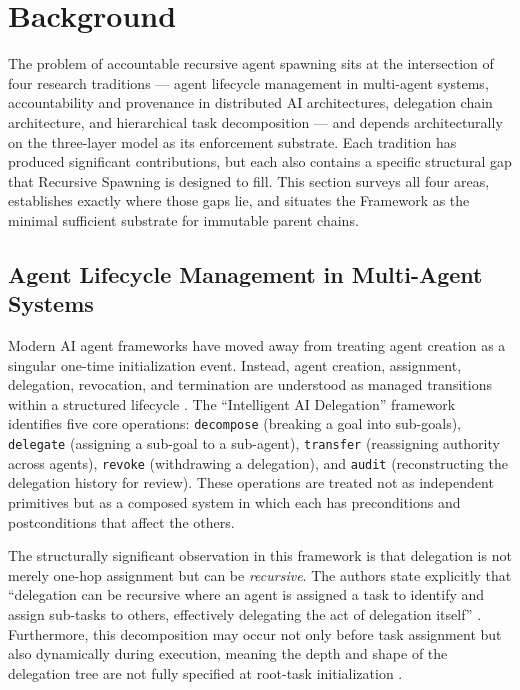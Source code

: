 \section{Background}\label{sec:rs-background}

The problem of accountable recursive agent spawning sits at the intersection of four research traditions --- agent lifecycle management in multi-agent systems, accountability and provenance in distributed AI architectures, delegation chain architecture, and hierarchical task decomposition --- and depends architecturally on the \bxthree{} three-layer model as its enforcement substrate.  Each tradition has produced significant contributions, but each also contains a specific structural gap that Recursive Spawning is designed to fill.  This section surveys all four areas, establishes exactly where those gaps lie, and situates the \bxthree{} Framework as the minimal sufficient substrate for immutable parent chains.

\subsection{Agent Lifecycle Management in Multi-Agent Systems}\label{sec:lifecycle}

Modern AI agent frameworks have moved away from treating agent creation as a singular one-time initialization event.  Instead, agent creation, assignment, delegation, revocation, and termination are understood as managed transitions within a structured lifecycle \cite{intelligent_ai_delegation}.  The ``Intelligent AI Delegation'' framework identifies five core operations: \texttt{decompose} (breaking a goal into sub-goals), \texttt{delegate} (assigning a sub-goal to a sub-agent), \texttt{transfer} (reassigning authority across agents), \texttt{revoke} (withdrawing a delegation), and \texttt{audit} (reconstructing the delegation history for review).  These operations are treated not as independent primitives but as a composed system in which each has preconditions and postconditions that affect the others.

The structurally significant observation in this framework is that delegation is not merely one-hop assignment but can be \emph{recursive}.  The authors state explicitly that ``delegation can be recursive where an agent is assigned a task to identify and assign sub-tasks to others, effectively delegating the act of delegation itself'' \cite[intelligent_ai_delegation, \S4.2]{arxiv2602.11865}.  Furthermore, this decomposition may occur not only before task assignment but also dynamically during execution, meaning the depth and shape of the delegation tree are not fully specified at root-task initialization \cite[intelligent_ai_delegation, \S4.1]{arxiv2602.11865}.

